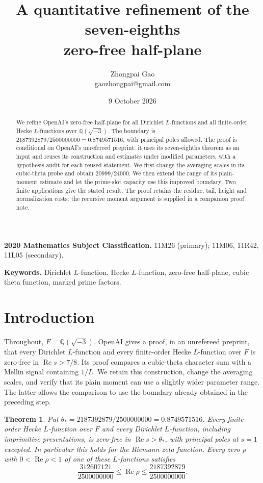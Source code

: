 \documentclass[11pt]{article}
\title{A quantitative refinement of the seven-eighths\\zero-free half-plane}
\author{Zhongpai Gao\\\small gaozhongpai@gmail.com}
\date{9 October 2026}
\newtheorem{theorem}{Theorem}[section]
\theoremstyle{definition}
\newcommand{\Q}{\mathbb Q}
\newcommand{\Rea}{\operatorname{Re}}
\begin{document}
\maketitle

\begin{abstract}
We refine OpenAI's zero-free half-plane for all Dirichlet $L$-functions
and all finite-order Hecke $L$-functions over $\Q(\sqrt{-3})$.
The boundary is $2187392879/2500000000=0.8749571516$, with principal poles
allowed. The proof is conditional on OpenAI's unrefereed preprint: it
uses its seven-eighths theorem as an input and reuses its construction
and estimates under modified parameters, with a hypothesis audit for
each reused statement. We first change the averaging scales in its
cubic-theta probe and obtain $20999/24000$. We then extend the range
of its plain-moment estimate and let the prime-slot capacity use this
improved boundary. Two finite applications give the stated result.
The proof retains the residue, tail, height and normalization costs;
the recursive moment argument is supplied in a companion proof note.
\end{abstract}

\noindent\textbf{2020 Mathematics Subject Classification.}
11M26 (primary); 11M06, 11R42, 11L05 (secondary).

\noindent\textbf{Keywords.}
Dirichlet $L$-function, Hecke $L$-function, zero-free half-plane,
cubic theta function, marked prime factors.

\section{Introduction}\label{gex:introduction}

Throughout, $F=\Q(\sqrt{-3})$. OpenAI \cite{OAI26} gives a proof, in an
unrefereed preprint, that every Dirichlet $L$-function and every
finite-order Hecke $L$-function over $F$ is zero-free in $\Rea s>7/8$.
Its proof compares a cubic-theta
character sum with a Mellin signal containing $1/L$. We retain this
construction, change the averaging scales, and verify that its plain
moment can use a slightly wider parameter range. The latter allows
the comparison to use the boundary already obtained in the preceding
step.

\begin{theorem}\label{gex:main}
Put $\theta_*=2187392879/2500000000=0.8749571516$.
Every finite-order Hecke $L$-function over
$F$ and every Dirichlet $L$-function, including imprimitive
presentations, is zero-free in $\Rea s>\theta_*$, with principal poles
at $s=1$ excepted. In particular this holds for the Riemann zeta
function. Every zero $\rho$ with $0<\Rea\rho<1$ of one of these
$L$-functions satisfies
\[
 \frac{312607121}{2500000000}\le\Rea\rho
       \le\frac{2187392879}{2500000000}.
\]
\end{theorem}
\end{document}
